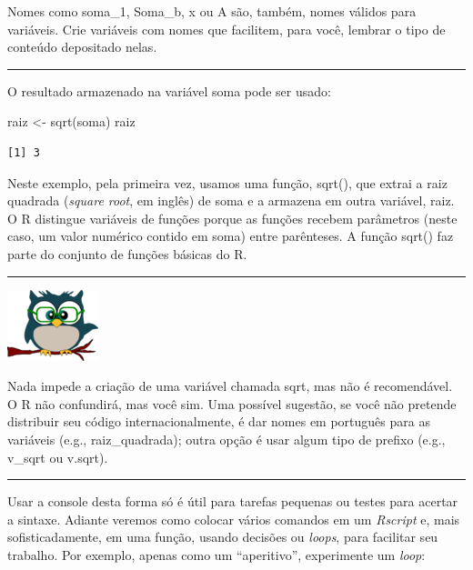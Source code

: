 \documentclass[
]{article}
\newenvironment{Shaded}{\begin{snugshade}}{\end{snugshade}}
\newcommand{\FunctionTok}[1]{\textcolor[rgb]{0.00,0.00,0.00}{#1}}
\newcommand{\NormalTok}[1]{#1}
\newcommand{\OtherTok}[1]{\textcolor[rgb]{0.56,0.35,0.01}{#1}}
\begin{document}
Nomes como soma\_1, Soma\_b, x ou A são, também, nomes válidos para
variáveis. Crie variáveis com nomes que facilitem, para você, lembrar o
tipo de conteúdo depositado nelas.

\begin{center}\rule{0.5\linewidth}{0.5pt}\end{center}

O resultado armazenado na variável soma pode ser usado:

\begin{Shaded}
\begin{Highlighting}[]
\NormalTok{raiz }\OtherTok{\textless{}{-}} \FunctionTok{sqrt}\NormalTok{(soma)}
\NormalTok{raiz}
\end{Highlighting}
\end{Shaded}

\begin{verbatim}
[1] 3
\end{verbatim}

Neste exemplo, pela primeira vez, usamos uma função, sqrt(), que extrai
a raiz quadrada (\emph{square root}, em inglês) de soma e a armazena em
outra variável, raiz. O R distingue variáveis de funções porque as
funções recebem parâmetros (neste caso, um valor numérico contido em
soma) entre parênteses. A função sqrt() faz parte do conjunto de funções
básicas do R.

\begin{center}\rule{0.5\linewidth}{0.5pt}\end{center}

\begin{flushleft}\includegraphics[width=0.08\linewidth]{coruja} \end{flushleft}

Nada impede a criação de uma variável chamada sqrt, mas não é
recomendável. O R não confundirá, mas você sim. Uma possível sugestão,
se você não pretende distribuir seu código internacionalmente, é dar
nomes em português para as variáveis (e.g., raiz\_quadrada); outra opção
é usar algum tipo de prefixo (e.g., v\_sqrt ou v.sqrt).

\begin{center}\rule{0.5\linewidth}{0.5pt}\end{center}

Usar a console desta forma só é útil para tarefas pequenas ou testes
para acertar a sintaxe. Adiante veremos como colocar vários comandos em
um \emph{Rscript} e, mais sofisticadamente, em uma função, usando
decisões ou \emph{loops}, para facilitar seu trabalho. Por exemplo,
apenas como um ``aperitivo'', experimente um \emph{loop}:
\end{document}

